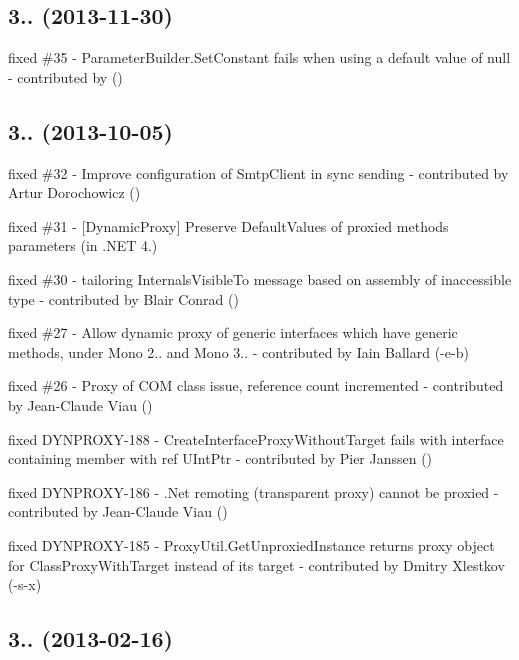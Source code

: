 \subsection*{3.. (2013-\/11-\/30)}


\begin{DoxyItemize}
\item fixed \#35 -\/ Parameter\+Builder.\+Set\+Constant fails when using a default value of null -\/ contributed by ()
\end{DoxyItemize}

\subsection*{3.. (2013-\/10-\/05)}


\begin{DoxyItemize}
\item fixed \#32 -\/ Improve configuration of Smtp\+Client in sync sending -\/ contributed by Artur Dorochowicz ()
\item fixed \#31 -\/ \mbox{[}Dynamic\+Proxy\mbox{]} Preserve Default\+Values of proxied method\textquotesingle{}s parameters (in .N\+ET 4.)
\item fixed \#30 -\/ tailoring Internals\+Visible\+To message based on assembly of inaccessible type -\/ contributed by Blair Conrad ()
\item fixed \#27 -\/ Allow dynamic proxy of generic interfaces which have generic methods, under Mono 2.. and Mono 3.. -\/ contributed by Iain Ballard (-\/e-\/b)
\item fixed \#26 -\/ Proxy of C\+OM class issue, reference count incremented -\/ contributed by Jean-\/\+Claude Viau ()
\item fixed D\+Y\+N\+P\+R\+O\+X\+Y-\/188 -\/ Create\+Interface\+Proxy\+Without\+Target fails with interface containing member with \textquotesingle{}ref U\+Int\+Ptr\textquotesingle{} -\/ contributed by Pier Janssen ()
\item fixed D\+Y\+N\+P\+R\+O\+X\+Y-\/186 -\/ .Net remoting (transparent proxy) cannot be proxied -\/ contributed by Jean-\/\+Claude Viau ()
\item fixed D\+Y\+N\+P\+R\+O\+X\+Y-\/185 -\/ Proxy\+Util.\+Get\+Unproxied\+Instance returns proxy object for Class\+Proxy\+With\+Target instead of its target -\/ contributed by Dmitry Xlestkov (-\/s-\/x)
\end{DoxyItemize}

\subsection*{3.. (2013-\/02-\/16)}



